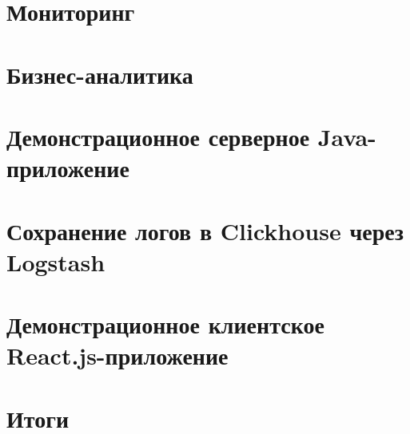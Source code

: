 \documentclass[a4paper,12pt]{article}
\begin{document}
    \section{Мониторинг}\label{sec:-monitoring-}
    

    \section{Бизнес-аналитика}\label{sec:-businessintelligence-}
    

    \section{Демонстрационное серверное Java-приложение}\label{sec:-javaapp-}
    

    \section{Сохранение логов в Clickhouse через Logstash}\label{sec:-logstashclickhouse-}
    

    \section{Демонстрационное клиентское React.js-приложение}\label{sec:-reactapp-}
    

    \section{Итоги}\label{sec:results}
    
\end{document}
